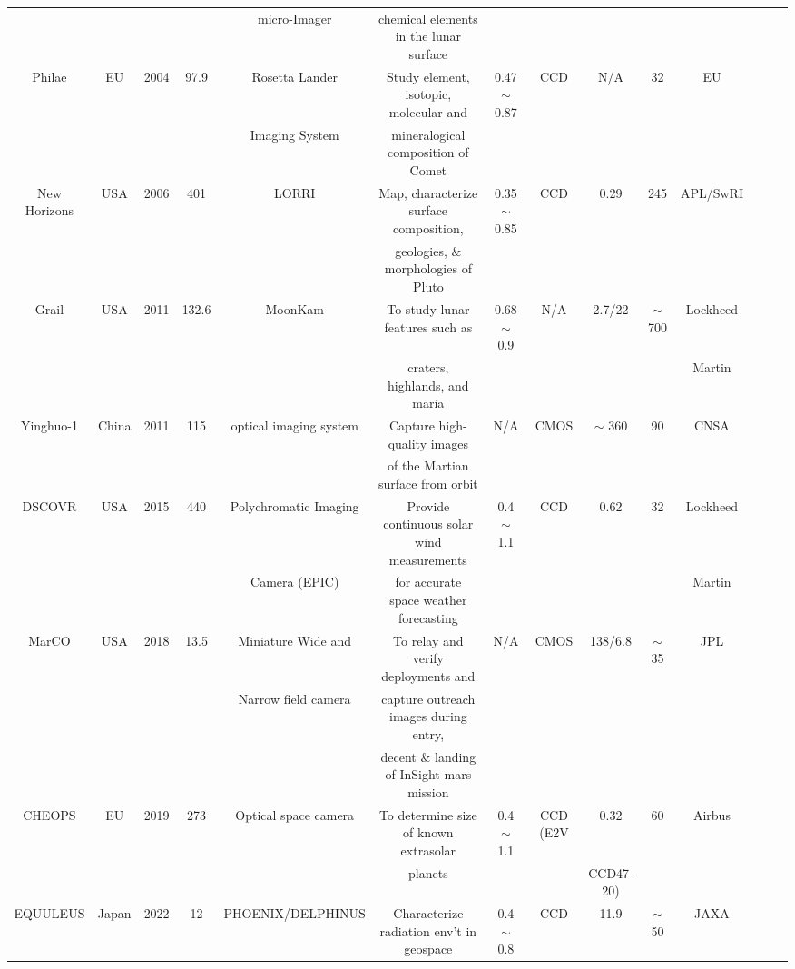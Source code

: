 \documentclass[final,5p,times,twocolumn]{elsarticle}
\begin{document}
\begin{table}
{\begin{tabular}{c c c c c c c c c c c c c c}
			& & & & micro-Imager & chemical elements in the lunar surface & & &  & & & &\\
			Philae & EU & 2004 & 97.9 & Rosetta Lander & Study element, isotopic, molecular and &0.47 $\sim$ 0.87 & CCD & N/A & 32 & EU & \citep{bibring2007rosetta, boehnhardt2017philae}\\
			& & & & Imaging System & mineralogical composition of Comet &  & & & & & &\\
			New Horizons & USA & 2006 & 401 & LORRI & Map, characterize surface composition, & 0.35 $\sim$ 0.85 & CCD & 0.29 & 245 &  APL/SwRI& \citep{stern2015pluto, weaver2009overview}\\
			& & & & & geologies, $\&$ morphologies of Pluto & & & & & & &\\
			Grail & USA & 2011 & 132.6 & MoonKam & To study lunar features such as  & 0.68 $\sim$ 0.9 & N/A & 2.7/22 & $\sim$ 700  & Lockheed& \citep{zuber2013gravity, williams2014lunar}\\
			& & & & & craters, highlands, and maria  & & & & &  Martin&\\
			Yinghuo-1 & China & 2011 & 115 & optical imaging system & Capture high-quality images & N/A & CMOS & $\sim$ 360 & 90  & CNSA & \citep{zheng2013china, hua2008yinghuo}\\
			& & & & & of the Martian surface from orbit & & & & & & &\\
			DSCOVR & USA & 2015 & 440 & Polychromatic Imaging & Provide continuous solar wind measurements  & 0.4 $\sim$ 1.1 & CCD & 0.62 & 32   & Lockheed & \citep{eoportal, marshak2018earth}\\
			& & & & Camera (EPIC) & for accurate space weather forecasting& & &  & &  Martin &\\
			MarCO & USA & 2018 & 13.5 & Miniature Wide and & To relay and verify deployments and  & N/A & CMOS & 138/6.8 & $\sim$ 35 &  JPL & \citep{schoolcraft2017marco, jpl2018}\\
			& & & & Narrow field camera & capture outreach images during entry, & & & & & && &\\
			& & & & & decent $\&$ landing of InSight mars mission & & & & && & &\\
			CHEOPS & EU & 2019 & 273 & Optical space camera & To determine size of known extrasolar  & 0.4 $\sim$ 1.1 & CCD (E2V & 0.32 & 60 &  Airbus & \citep{broeg2013cheops, fortier2014cheops}\\
			& & & & & planets & & & CCD47-20) & & & & \\
			EQUULEUS & Japan & 2022 & 12 & PHOENIX/DELPHINUS  & Characterize radiation env't in geospace & 0.4 $\sim$ 0.8 & CCD & 11.9 & $\sim$50 &  JAXA & \citep{funase2020mission, ikari2019solar}\\

\end{tabular}}
\end{table}
\end{document}
